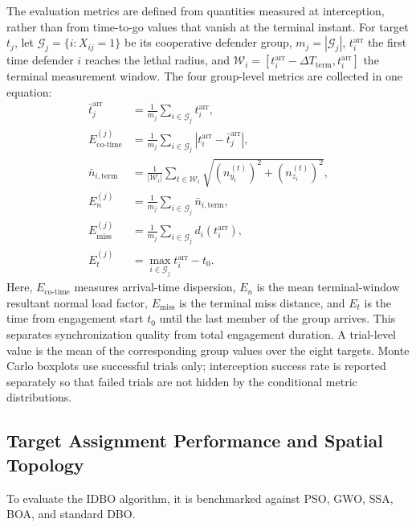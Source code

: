 \documentclass[lettersize,journal]{IEEEtran}
\begin{document}
The evaluation metrics are defined from quantities measured at interception, rather than from
time-to-go values that vanish at the terminal instant. For target $t_j$, let
$\mathcal G_j=\{i:X_{ij}=1\}$ be its cooperative defender group,
$m_j=|\mathcal G_j|$, $t_i^{\mathrm{arr}}$ the first time defender $i$ reaches the lethal
radius, and $\mathcal W_i=[t_i^{\mathrm{arr}}-\Delta T_{\mathrm{term}},
t_i^{\mathrm{arr}}]$ the terminal measurement window. The four group-level metrics are
collected in one equation:
\begin{equation}
\label{eq:evaluation_metrics}
\begin{aligned}
\bar t_j^{\mathrm{arr}}
 &=\frac{1}{m_j}\sum_{i\in\mathcal G_j}t_i^{\mathrm{arr}},\\
E_{\mathrm{co\text{-}time}}^{(j)}
 &=\frac{1}{m_j}\sum_{i\in\mathcal G_j}
 \left|t_i^{\mathrm{arr}}-\bar t_j^{\mathrm{arr}}\right|,\\
\bar n_{i,\mathrm{term}}
 &=\frac{1}{|\mathcal W_i|}\sum_{t\in\mathcal W_i}
 \sqrt{(n_{y_i}^{(t)})^2+(n_{z_i}^{(t)})^2},\\
E_n^{(j)}
 &=\frac{1}{m_j}\sum_{i\in\mathcal G_j}
 \bar n_{i,\mathrm{term}},\\
E_{\mathrm{miss}}^{(j)}
 &=\frac{1}{m_j}\sum_{i\in\mathcal G_j}d_i(t_i^{\mathrm{arr}}),\\
E_t^{(j)}&=\max_{i\in\mathcal G_j}t_i^{\mathrm{arr}}-t_0.
\end{aligned}
\end{equation}
Here, $E_{\mathrm{co\text{-}time}}$ measures arrival-time dispersion,
$E_n$ is the mean terminal-window resultant normal load factor, $E_{\mathrm{miss}}$ is the terminal miss
distance, and $E_t$ is the time from engagement start $t_0$ until the last member of the group
arrives. This separates synchronization quality from total engagement duration. A trial-level
value is the mean of the corresponding group values over the eight targets. Monte Carlo
boxplots use successful trials only; interception success rate is reported separately so that
failed trials are not hidden by the conditional metric distributions.
 
\endgroup
\subsection{Target Assignment Performance and Spatial Topology}
\label{subsec:assignment_results}

To evaluate the IDBO algorithm, it is benchmarked against PSO, GWO, SSA, BOA, and standard DBO. 
\end{document}
